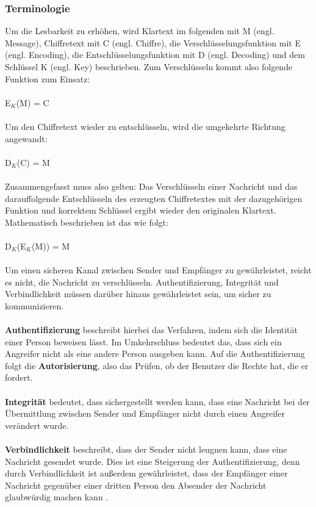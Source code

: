\documentclass[10pt, a4paper,headsepline,pointednumbers]{scrreprt}
\begin{document}
\subsubsection{Terminologie}
Um die Lesbarkeit zu erhöhen, wird Klartext im folgenden mit M (engl. Message), Chiffretext mit C (engl. Chiffre), die Verschlüsselungsfunktion mit E (engl. Encoding), die Entschlüsselungsfunktion mit D (engl. Decoding) und dem Schlüssel K (engl. Key) beschrieben.
Zum Verschlüsseln kommt also folgende Funktion zum Einsatz: \\ \\
E$_{K}$(M) = C\\ \\ 
Um den Chiffretext wieder zu entschlüsseln, wird die umgekehrte Richtung angewandt:\\ \\
D$_{K}$(C) = M\\ \\
Zusammengefasst muss also gelten: Das Verschlüsseln einer Nachricht und das darauffolgende Entschlüsseln des erzeugten Chiffretextes mit der dazugehörigen Funktion und korrektem Schlüssel ergibt wieder den originalen Klartext. Mathematisch beschrieben ist das wie folgt:\\ \\
D$_{K}$(E$_{K}$(M)) = M\\ \\
Um einen sicheren Kanal zwischen Sender und Empfänger zu gewährleistet, reicht es nicht, die Nachricht zu verschlüsseln. Authentifizierung, Integrität und Verbindlichkeit müssen darüber hinaus gewährleistet sein, um sicher zu kommunizieren. \\ \\
\textbf{Authentifizierung} beschreibt hierbei das Verfahren, indem sich die Identität einer Person beweisen lässt. Im Umkehrschluss bedeutet das, dass sich ein Angreifer nicht als eine andere Person ausgeben kann. Auf die Authentifizierung folgt die \textbf{Autorisierung}, also das Prüfen, ob der Benutzer die Rechte hat, die er fordert.\\ \\
\textbf{Integrität} bedeutet, dass sichergestellt werden kann, dass eine Nachricht bei der Übermittlung zwischen Sender und Empfänger nicht durch einen Angreifer verändert wurde. \\ \\
\textbf{Verbindlichkeit} beschreibt,  dass der Sender nicht leugnen kann, dass eine Nachricht gesendet wurde. Dies ist eine Steigerung der Authentifizierung, denn durch Verbindlichkeit ist außerdem gewährleistet, dass der Empfänger einer Nachricht gegenüber einer dritten Person den Absender der Nachricht glaubwürdig machen kann \citep[S. 1f]{book:angewandte-krypto}. \\ \\
\end{document}

